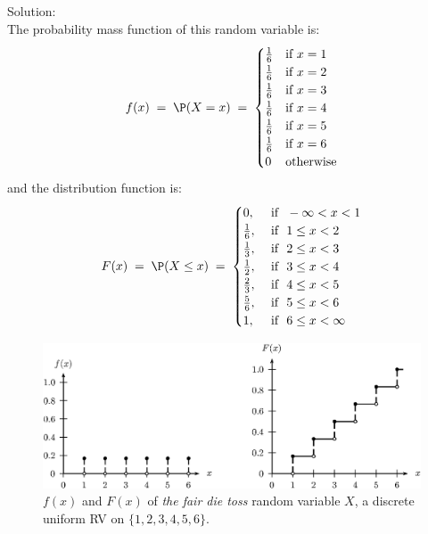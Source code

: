 \begin{example}
Solution:\\[4pt]
The probability mass function of this random variable is:
\[f(x)\;=\;\P(X=x)\;=\;
\begin{cases}
\frac{1}{6} & \text{if } x=1\\
\frac{1}{6} & \text{if } x=2\\
\frac{1}{6} & \text{if } x=3\\
\frac{1}{6} & \text{if } x=4\\
\frac{1}{6} & \text{if } x=5\\
\frac{1}{6} & \text{if } x=6\\
0 & \text{otherwise}
\end{cases}\] and the  distribution function is:
\[F(x)\; = \;\P(X \leq x) \;=\;
\begin{cases}
 0, & \text{ if } \ -\infty < x < 1\\
 \frac{1}{6}, & \text{ if } \ 1 \leq x < 2\\
\frac{1}{3}, & \text{ if } \ 2 \leq x < 3\\
\frac{1}{2}, & \text{ if } \ 3 \leq x < 4\\
\frac{2}{3}, & \text{ if } \ 4 \leq x < 5\\
\frac{5}{6}, & \text{ if } \ 5 \leq x < 6\\
 1,& \text{ if } \ 6 \leq x < \infty
\end{cases}
\]
\begin{figure}[htbp]
\begin{center}
\includegraphics{pstricks/fairdiefF}
\caption{$f(x)$ and $F(x)$ of {\em the fair die toss} random variable $X$, a discrete uniform RV on $\{1,2,3,4,5,6\}$.}
\end{center}
\end{figure}
\end{example}

